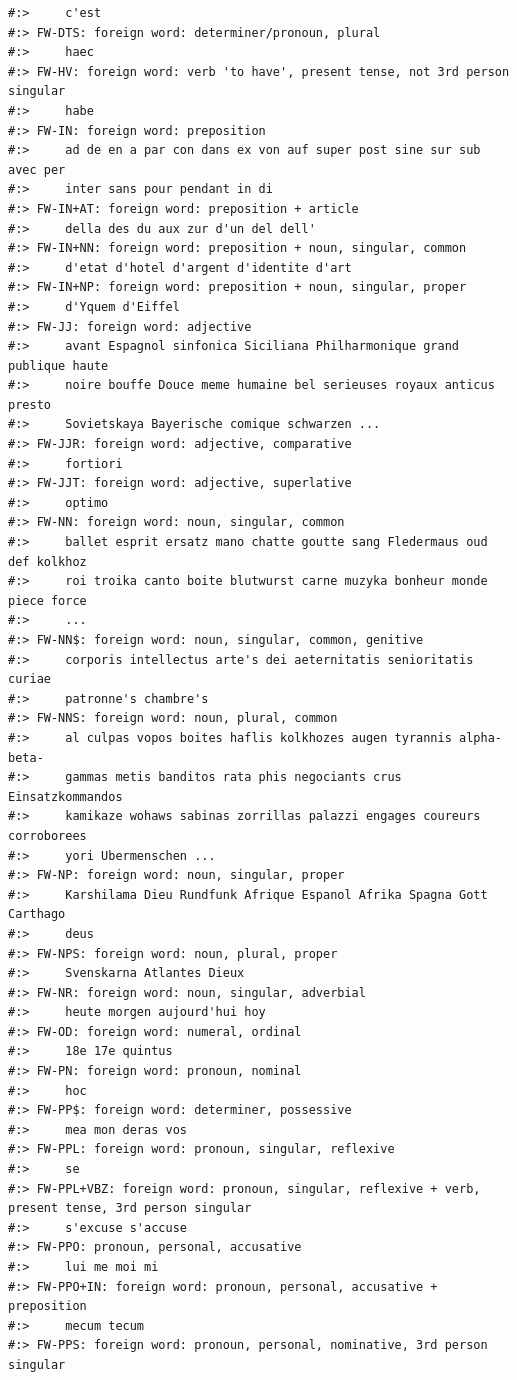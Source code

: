 \documentclass[
]{book}
\begin{document}
\begin{verbatim}
#:>     c'est
#:> FW-DTS: foreign word: determiner/pronoun, plural
#:>     haec
#:> FW-HV: foreign word: verb 'to have', present tense, not 3rd person singular
#:>     habe
#:> FW-IN: foreign word: preposition
#:>     ad de en a par con dans ex von auf super post sine sur sub avec per
#:>     inter sans pour pendant in di
#:> FW-IN+AT: foreign word: preposition + article
#:>     della des du aux zur d'un del dell'
#:> FW-IN+NN: foreign word: preposition + noun, singular, common
#:>     d'etat d'hotel d'argent d'identite d'art
#:> FW-IN+NP: foreign word: preposition + noun, singular, proper
#:>     d'Yquem d'Eiffel
#:> FW-JJ: foreign word: adjective
#:>     avant Espagnol sinfonica Siciliana Philharmonique grand publique haute
#:>     noire bouffe Douce meme humaine bel serieuses royaux anticus presto
#:>     Sovietskaya Bayerische comique schwarzen ...
#:> FW-JJR: foreign word: adjective, comparative
#:>     fortiori
#:> FW-JJT: foreign word: adjective, superlative
#:>     optimo
#:> FW-NN: foreign word: noun, singular, common
#:>     ballet esprit ersatz mano chatte goutte sang Fledermaus oud def kolkhoz
#:>     roi troika canto boite blutwurst carne muzyka bonheur monde piece force
#:>     ...
#:> FW-NN$: foreign word: noun, singular, common, genitive
#:>     corporis intellectus arte's dei aeternitatis senioritatis curiae
#:>     patronne's chambre's
#:> FW-NNS: foreign word: noun, plural, common
#:>     al culpas vopos boites haflis kolkhozes augen tyrannis alpha-beta-
#:>     gammas metis banditos rata phis negociants crus Einsatzkommandos
#:>     kamikaze wohaws sabinas zorrillas palazzi engages coureurs corroborees
#:>     yori Ubermenschen ...
#:> FW-NP: foreign word: noun, singular, proper
#:>     Karshilama Dieu Rundfunk Afrique Espanol Afrika Spagna Gott Carthago
#:>     deus
#:> FW-NPS: foreign word: noun, plural, proper
#:>     Svenskarna Atlantes Dieux
#:> FW-NR: foreign word: noun, singular, adverbial
#:>     heute morgen aujourd'hui hoy
#:> FW-OD: foreign word: numeral, ordinal
#:>     18e 17e quintus
#:> FW-PN: foreign word: pronoun, nominal
#:>     hoc
#:> FW-PP$: foreign word: determiner, possessive
#:>     mea mon deras vos
#:> FW-PPL: foreign word: pronoun, singular, reflexive
#:>     se
#:> FW-PPL+VBZ: foreign word: pronoun, singular, reflexive + verb, present tense, 3rd person singular
#:>     s'excuse s'accuse
#:> FW-PPO: pronoun, personal, accusative
#:>     lui me moi mi
#:> FW-PPO+IN: foreign word: pronoun, personal, accusative + preposition
#:>     mecum tecum
#:> FW-PPS: foreign word: pronoun, personal, nominative, 3rd person singular

\end{verbatim}
\end{document}
